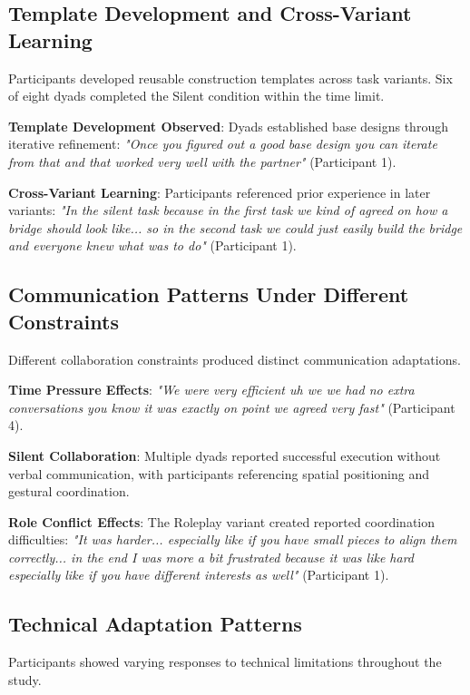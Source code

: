 \subsection{Template Development and Cross-Variant Learning}

Participants developed reusable construction templates across task variants. Six of eight dyads completed the Silent condition within the time limit.

\textbf{Template Development Observed}: Dyads established base designs through iterative refinement: \textit{"Once you figured out a good base design you can iterate from that and that worked very well with the partner"} (Participant 1).

\textbf{Cross-Variant Learning}: Participants referenced prior experience in later variants: \textit{"In the silent task because in the first task we kind of agreed on how a bridge should look like... so in the second task we could just easily build the bridge and everyone knew what was to do"} (Participant 1).

\subsection{Communication Patterns Under Different Constraints}

Different collaboration constraints produced distinct communication adaptations.

\textbf{Time Pressure Effects}: \textit{"We were very efficient uh we we had no extra conversations you know it was exactly on point we agreed very fast"} (Participant 4).

\textbf{Silent Collaboration}: Multiple dyads reported successful execution without verbal communication, with participants referencing spatial positioning and gestural coordination.

\textbf{Role Conflict Effects}: The Roleplay variant created reported coordination difficulties: \textit{"It was harder... especially like if you have small pieces to align them correctly... in the end I was more a bit frustrated because it was like hard especially like if you have different interests as well"} (Participant 1).

\subsection{Technical Adaptation Patterns}

Participants showed varying responses to technical limitations throughout the study.

